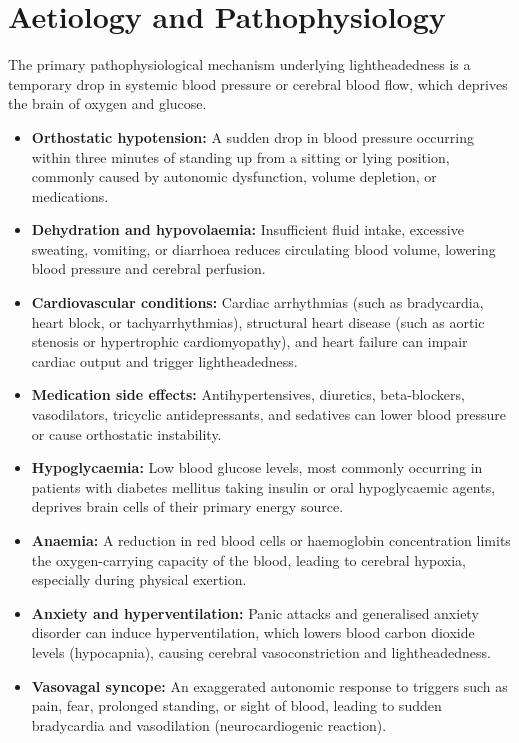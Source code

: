 \section*{Aetiology and Pathophysiology}
The primary pathophysiological mechanism underlying lightheadedness is a temporary drop in systemic blood pressure or cerebral blood flow, which deprives the brain of oxygen and glucose.
\begin{itemize}
    \item \textbf{Orthostatic hypotension:} A sudden drop in blood pressure occurring within three minutes of standing up from a sitting or lying position, commonly caused by autonomic dysfunction, volume depletion, or medications.
    \item \textbf{Dehydration and hypovolaemia:} Insufficient fluid intake, excessive sweating, vomiting, or diarrhoea reduces circulating blood volume, lowering blood pressure and cerebral perfusion.
    \item \textbf{Cardiovascular conditions:} Cardiac arrhythmias (such as bradycardia, heart block, or tachyarrhythmias), structural heart disease (such as aortic stenosis or hypertrophic cardiomyopathy), and heart failure can impair cardiac output and trigger lightheadedness.
    \item \textbf{Medication side effects:} Antihypertensives, diuretics, beta-blockers, vasodilators, tricyclic antidepressants, and sedatives can lower blood pressure or cause orthostatic instability.
    \item \textbf{Hypoglycaemia:} Low blood glucose levels, most commonly occurring in patients with diabetes mellitus taking insulin or oral hypoglycaemic agents, deprives brain cells of their primary energy source.
    \item \textbf{Anaemia:} A reduction in red blood cells or haemoglobin concentration limits the oxygen-carrying capacity of the blood, leading to cerebral hypoxia, especially during physical exertion.
    \item \textbf{Anxiety and hyperventilation:} Panic attacks and generalised anxiety disorder can induce hyperventilation, which lowers blood carbon dioxide levels (hypocapnia), causing cerebral vasoconstriction and lightheadedness.
    \item \textbf{Vasovagal syncope:} An exaggerated autonomic response to triggers such as pain, fear, prolonged standing, or sight of blood, leading to sudden bradycardia and vasodilation (neurocardiogenic reaction).
\end{itemize}


